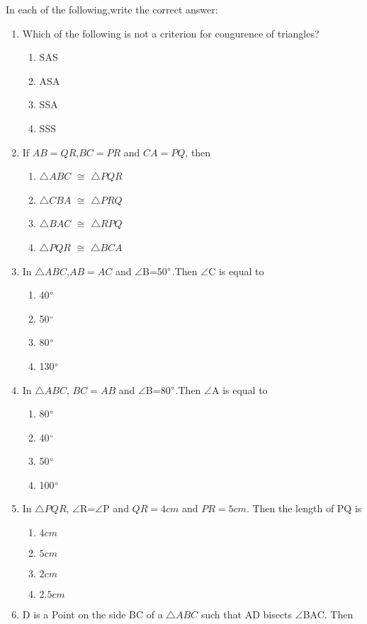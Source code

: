 \documentclass{article}
\begin{document}
In each of the following,write the correct answer:

\begin{enumerate}
\item Which of the following is not a criterion for congurence of triangles?
\begin{enumerate} 
\item SAS
\item ASA
\item SSA
\item SSS
\end{enumerate}
\item If $AB=QR$,$BC=PR$ and $CA=PQ$, then
\begin{enumerate}
\item $\triangle ABC$ $\cong$ $\triangle PQR$
\item $\triangle CBA$ $\cong$ $\triangle PRQ$
\item $\triangle BAC$ $\cong$ $\triangle RPQ$
\item $\triangle PQR$ $\cong$ $\triangle BCA$
\end{enumerate}
\item In $\triangle ABC$,$AB=AC$ and $\angle$B=50$\degree$.Then $\angle$C is equal to
\begin{enumerate}
\item 40$\degree$
\item 50$\degree$
\item 80$\degree$
\item 130$\degree$
\end{enumerate}
\item In $\triangle ABC$, $BC=AB$ and $\angle$B=80$\degree$.Then $\angle$A is equal to
\begin{enumerate}
\item 80$\degree$
\item 40$\degree$
\item 50$\degree$
\item 100$\degree$
\end{enumerate}
\item In $\triangle PQR$, $\angle$R=$\angle$P and $QR=4cm$ and $PR=5cm$. Then the length of PQ is
\begin{enumerate}
\item $4cm$
\item $5cm$
\item $2cm$
\item $2.5cm$
\end{enumerate}
\item D is a Point on the side BC of a $\triangle ABC$ such that AD bisects $\angle$BAC. Then

\end{enumerate}
\end{document}
